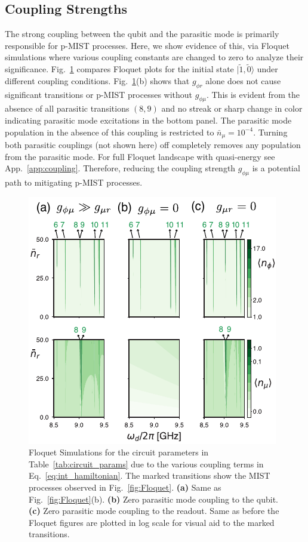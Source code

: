 \documentclass[%
reprint,
superscriptaddress,
 amsmath,amssymb,
 aps,
 prx,
longbibliography,
floatfix,
]{revtex4-2}
\begin{document}
\subsection{Coupling Strengths} \label{sec:coupling}
The strong coupling between the qubit and the parasitic mode is primarily responsible for p-MIST processes. Here, we show evidence of this, via Floquet simulations where various coupling constants are changed to zero to analyze their significance. Fig.~\ref{fig:coupling-Floquet} compares Floquet plots for the initial state $|\tilde{1}, \tilde{0}\rangle$ under different coupling conditions. Fig.~\ref{fig:coupling-Floquet}(b) shows that $g_{\phi r}$ alone does not cause significant transitions or p-MIST processes without $g_{\phi \mu}$. This is evident from the absence of all parasitic transitions $(8,9)$ and no streak or sharp change in color indicating parasitic mode excitations in the bottom panel. The parasitic mode population in the absence of this coupling is restricted to $\bar n_\mu=10^{-4}$. Turning both parasitic couplings (not shown here) off completely removes any population from the parasitic mode. For full Floquet landscape with quasi-energy see App.~\ref{app:coupling}. Therefore, reducing the coupling strength $g_{\phi \mu}$ is a potential path to mitigating p-MIST processes. 
\begin{figure}[!htb]
    \centering
    \includegraphics[width=\linewidth]{Figures/Floquet_coupling.pdf}
    \caption{Floquet Simulations for the circuit parameters in Table~\ref{tab:circuit_params} due to the various coupling terms in Eq.~\ref{eq:int_hamiltonian}. The marked transitions show the MIST processes observed in Fig.~\ref{fig:Floquet}. \textbf{(a)} Same as Fig.~\ref{fig:Floquet}(b). \textbf{(b)} Zero parasitic mode coupling to the qubit. \textbf{(c)} Zero parasitic mode coupling to the readout. Same as before the Floquet figures are plotted in log scale for visual aid to the marked transitions.}
    \label{fig:coupling-Floquet}
\end{figure}
\end{document}
